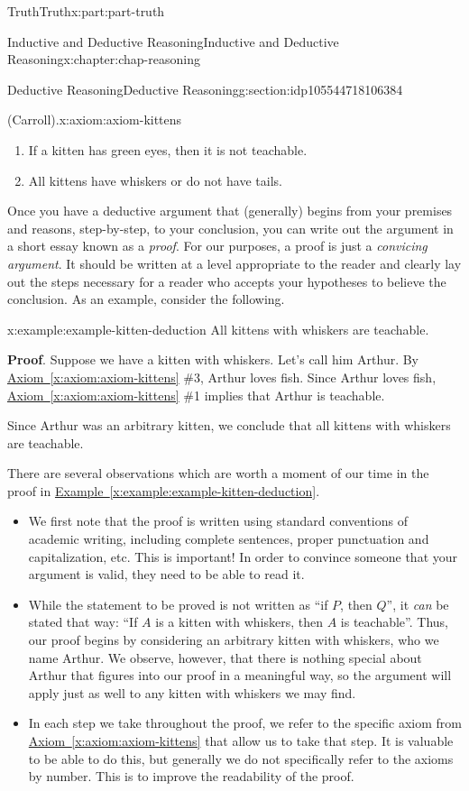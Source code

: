 \documentclass[oneside,10pt,]{book}
\newcommand{\xreffont}{\relax}
\newcommand{\terminology}[1]{\textbf{#1}}
\numberwithin{equation}{section}
\begin{document}
\begin{partptx}{Truth}{}{Truth}{}{}{x:part:part-truth}
\begin{chapterptx}{Inductive and Deductive Reasoning}{}{Inductive and Deductive Reasoning}{}{}{x:chapter:chap-reasoning}
\begin{sectionptx}{Deductive Reasoning}{}{Deductive Reasoning}{}{}{g:section:idp105544718106384}
\begin{axiom}{(Carroll).}{}{x:axiom:axiom-kittens}
\begin{enumerate}
\item{}If a kitten has green eyes, then it is not teachable.%
\item{}All kittens have whiskers or do not have tails.%
\end{enumerate}
\end{axiom}
Once you have a deductive argument that (generally) begins from your premises and reasons, step-by-step, to your conclusion, you can write out the argument in a short essay known as a \emph{proof}. For our purposes, a proof is just a \emph{convicing argument}. It should be written at a level appropriate to the reader and clearly lay out the steps necessary for a reader who accepts your hypotheses to believe the conclusion. As an example, consider the following.%
\begin{example}{}{x:example:example-kitten-deduction}%
All kittens with whiskers are teachable.%
\par
\terminology{Proof}. Suppose we have a kitten with whiskers. Let's call him Arthur. By \hyperref[x:axiom:axiom-kittens]{Axiom~{\xreffont\ref{x:axiom:axiom-kittens}}} \#3, Arthur loves fish. Since Arthur loves fish, \hyperref[x:axiom:axiom-kittens]{Axiom~{\xreffont\ref{x:axiom:axiom-kittens}}} \#1 implies that Arthur is teachable.%
\par
Since Arthur was an arbitrary kitten, we conclude that all kittens with whiskers are teachable.%
\end{example}
There are several observations which are worth a moment of our time in the proof in \hyperref[x:example:example-kitten-deduction]{Example~{\xreffont\ref{x:example:example-kitten-deduction}}}.%
%
\begin{itemize}[label=\textbullet]
\item{}We first note that the proof is written using standard conventions of academic writing, including complete sentences, proper punctuation and capitalization, etc. This is important! In order to convince someone that your argument is valid, they need to be able to read it.%
\item{}While the statement to be proved is not written as ``if \(P\), then \(Q\)'', it \emph{can} be stated that way: ``If \(A\) is a kitten with whiskers, then \(A\) is teachable''. Thus, our proof begins by considering an arbitrary kitten with whiskers, who we name Arthur. We observe, however, that there is nothing special about Arthur that figures into our proof in a meaningful way, so the argument will apply just as well to any kitten with whiskers we may find.%
\item{}In each step we take throughout the proof, we refer to the specific axiom from \hyperref[x:axiom:axiom-kittens]{Axiom~{\xreffont\ref{x:axiom:axiom-kittens}}} that allow us to take that step. It is valuable to be able to do this, but generally we do not specifically refer to the axioms by number. This is to improve the readability of the proof.%

\end{itemize}
\end{sectionptx}
\end{chapterptx}
\end{partptx}
\end{document}
